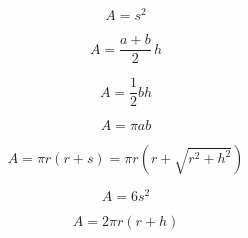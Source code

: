 \[\begin{equation} A = s^2 \end{equation}\]

\[\begin{equation} A = \frac{a + b}{2} \, h \end{equation}\]

\[\begin{equation} A = \frac{1}{2} b h \end{equation}\]

\[\begin{equation} A = \pi a b \end{equation}\]

\[\begin{equation} A = \pi r \left( r + s \right) = \pi r \left( r + \sqrt{r^2 + h^2} \right) \end{equation}\]

\[\begin{equation} A = 6 s^2 \end{equation}\]

\[\begin{equation} A = 2 \pi r \left( r + h \right) \end{equation}\]

